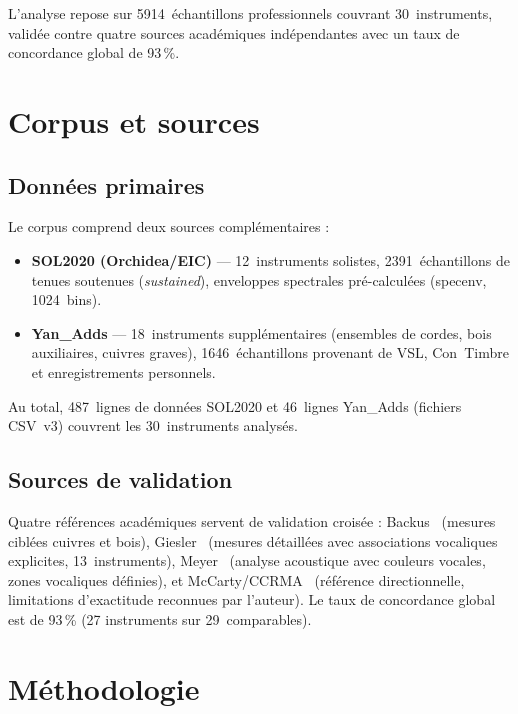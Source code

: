 \documentclass[11pt,a4paper]{article}
\begin{document}
L'analyse repose sur \num{5914}~échantillons professionnels couvrant
30~instruments, validée contre quatre sources académiques indépendantes
avec un taux de concordance global de 93\,\%.


\section{Corpus et sources}

\subsection{Données primaires}

Le corpus comprend deux sources complémentaires :

\begin{itemize}
  \item \textbf{SOL2020 (Orchidea/EIC)} --- 12~instruments solistes,
    \num{2391}~échantillons de tenues soutenues (\emph{sustained}),
    enveloppes spectrales pré-calculées (specenv, 1024~bins).
  \item \textbf{Yan\_Adds} --- 18~instruments supplémentaires (ensembles
    de cordes, bois auxiliaires, cuivres graves), \num{1646}~échantillons
    provenant de VSL, Con~Timbre et enregistrements personnels.
\end{itemize}

Au total, 487~lignes de données SOL2020 et 46~lignes Yan\_Adds (fichiers
CSV~v3) couvrent les 30~instruments analysés.

\subsection{Sources de validation}

Quatre références académiques servent de validation croisée :
Backus~\cite{backus1969} (mesures ciblées cuivres et bois),
Giesler~\cite{giesler1985} (mesures détaillées avec associations
vocaliques explicites, 13~instruments), Meyer~\cite{meyer2009} (analyse
acoustique avec couleurs vocales, zones vocaliques définies), et
McCarty/CCRMA~\cite{mccarty2003} (référence directionnelle, limitations
d'exactitude reconnues par l'auteur). Le taux de concordance global est
de 93\,\% (27 instruments sur 29~comparables).


\section{Méthodologie}
\end{document}
